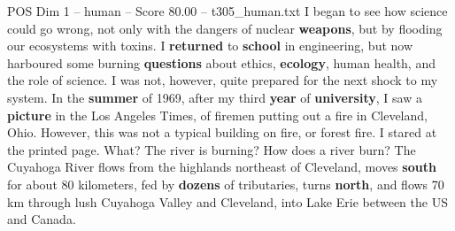 \begin{textsample}{POS Dim 1 – human – Score 80.00 – t305\_human.txt}
I began to see how science could go wrong, not only with the dangers of nuclear \textbf{weapons}, but by flooding our ecosystems with toxins.
I \textbf{returned} to \textbf{school} in engineering, but now harboured some burning \textbf{questions} about ethics, \textbf{ecology}, human health, and the role of science.
I was not, however, quite prepared for the next shock to my system.
In the \textbf{summer} of 1969, after my third \textbf{year} of \textbf{university}, I saw a \textbf{picture} in the Los Angeles Times, of firemen putting out a fire in Cleveland, Ohio.
However, this was not a typical building on fire, or forest fire.
I stared at the printed page.
What?
The river is burning?
How does a river burn?
The Cuyahoga River flows from the highlands northeast of Cleveland, moves \textbf{south} for about 80 kilometers, fed by \textbf{dozens} of tributaries, turns \textbf{north}, and flows 70 km through lush Cuyahoga Valley and Cleveland, into Lake Erie between the US and Canada.

\end{textsample}
